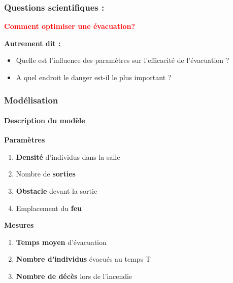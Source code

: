 \documentclass[10pt]{beamer}
\begin{document}
\begin{frame}
	\frametitle{\textbf {\Large Questions scientifiques :}}
	\begin{center}
		\LARGE \textcolor{red}{\textbf {Comment optimiser une évacuation?}}
	\end{center}
		
	\medskip 
	\large \textbf{Autrement dit :} 	
	\medskip
	
	\begin{itemize}
		\item \large Quelle est l'influence des paramètres sur l'efficacité de l'évacuation ?
		\medskip
		\item \large A quel endroit le danger est-il le plus important ?
	\end{itemize}
		
	
	
\end{frame}



\begin{frame}
	\frametitle{\textbf {\Large Modélisation}}
	\framesubtitle{\large Description du modèle}
	\begin{block}{\textbf{Paramètres}}
	\begin{enumerate}
		\item \textbf{Densité} d'individus dans la salle\\
		\item Nombre de \textbf{sorties}\\
		\item \textbf{Obstacle} devant la sortie \\
		\item Emplacement du \textbf{feu}\\
	\end{enumerate}
	\end{block}
	
	
	\begin{block}{\textbf{Mesures}}
	\begin{enumerate}
		\item \textbf{Temps moyen} d'évacuation\\
		\item \textbf{Nombre d'individus} évacués au temps T\\
		\item \textbf{Nombre de décès} lors de l'incendie\\
	\end{enumerate}
	\end{block}
\end{frame}
\end{document}
